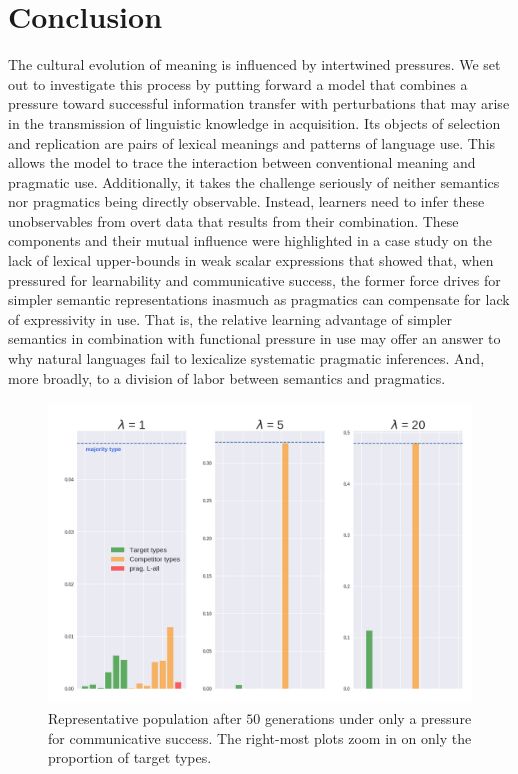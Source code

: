 \documentclass[a4paper, 11pt]{article}
\theoremstyle{Satz}
\begin{document}
\section{Conclusion}
The cultural evolution of meaning is influenced by intertwined pressures. We set out to
investigate this process by putting forward a model that combines a pressure toward successful
information transfer with perturbations that may arise in the transmission of linguistic
knowledge in acquisition. Its objects of selection and replication are pairs of lexical
meanings and patterns of language use. This allows the model to trace the interaction between
conventional meaning and pragmatic use. Additionally, it takes the challenge seriously of
neither semantics nor pragmatics being directly observable. Instead, learners need to infer
these unobservables from overt data that results from their combination.  These components and
their mutual influence were highlighted in a case study on the lack of lexical upper-bounds in
weak scalar expressions that showed that, when pressured for learnability and communicative
success, the former force drives for simpler semantic representations inasmuch as pragmatics
can compensate for lack of expressivity in use. That is, the relative learning advantage of
simpler semantics in combination with functional pressure in use may offer an answer to why
natural languages fail to lexicalize systematic pragmatic inferences. And, more broadly, to a
division of labor between semantics and pragmatics.





 \appendix
\newpage

\begin{figure}[t]
\centering
\includegraphics[width=\textwidth,height=8cm, keepaspectratio]{./plots/alt-fig1-onlyr}
\caption{Representative population after $50$ generations under only a
  pressure for communicative success. The right-most plots zoom in on only the proportion of
  target types.}
\label{fig:only-R}
\end{figure}
\end{document}
